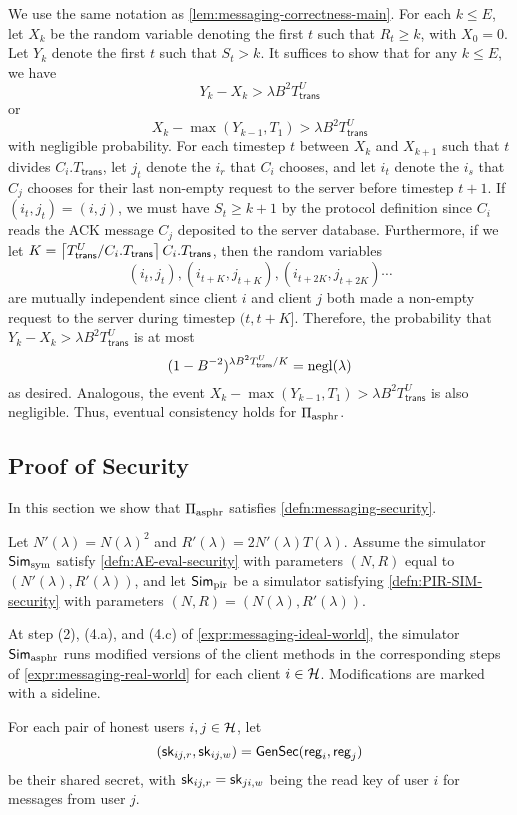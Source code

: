 We use the same notation as \cref{lem:messaging-correctness-main}. For each $k \leq E$, let $X_k$ be the random variable denoting the first $t$ such that $R_t \geq k$, with $X_0 = 0$. Let $Y_k$ denote the first $t$ such that $S_{t} > k$. It suffices to show that for any $k \leq E$, we have
 $$Y_k - X_k > \lambda B^2 T^U_{\mathsf{trans}}$$
 or
 $$X_{k} - \max(Y_{k - 1}, T_1) > \lambda B^2 T^U_{\mathsf{trans}}$$
 with negligible probability. For each timestep $t$ between $X_k$ and $X_{k + 1}$ such that $t$ divides $C_i.T_{\mathsf{trans}}$, let $j_t$ denote the $i_r$ that $C_i$ chooses, and let $i_t$ denote the $i_s$ that $C_j$ chooses for their last non-empty request to the server before timestep $t + 1$. If $(i_t, j_t) = (i, j)$, we must have $S_{t} \geq k + 1$ by the protocol definition since $C_i$ reads the ACK message $C_j$ deposited to the server database. Furthermore, if we let $K = \left\lceil T^U_{\mathsf{trans}} / C_i.T_{\mathsf{trans}} \right\rceil C_i.T_{\mathsf{trans}}$, then the random variables
 $$(i_t, j_t), (i_{t + K}, j_{t + K}), (i_{t + 2K}, j_{t + 2K})\cdots$$
are mutually independent since client $i$ and client $j$ both made a non-empty request to the server during timestep $(t, t + K]$. Therefore, the probability that $Y_k - X_k > \lambda B^2 T^U_{\mathsf{trans}}$ is at most
$$(1 - B^{-2})^{\lambda B^2 T^U_{\mathsf{trans}} / K} = \operatorname{negl}(\lambda)$$
as desired. Analogous, the event $X_{k} - \max(Y_{k - 1}, T_1) > \lambda B^2 T^U_{\mathsf{trans}}$ is also negligible. Thus, eventual consistency holds for $\Pi_{\text{asphr}}$.
\subsection{Proof of Security}
In this section we show that $\Pi_{\text{asphr}}$ satisfies \cref{defn:messaging-security}. 

Let $N'(\lambda) = N(\lambda)^2$ and $R'(\lambda) = 2N'(\lambda)T(\lambda)$. Assume the simulator $\mathsf{Sim}_{\text{sym}}$ satisfy \cref{defn:AE-eval-security} with parameters $(N, R)$ equal to $(N'(\lambda), R'(\lambda))$, and let $\mathsf{Sim}_{\text{pir}}$ be a simulator satisfying \cref{defn:PIR-SIM-security} with parameters $(N, R) = (N(\lambda), R'(\lambda))$. 

At step (2), (4.a), and (4.c) of \cref{expr:messaging-ideal-world}, the simulator $\mathsf{Sim}_{\text{asphr}}$ runs modified versions of the client methods in the corresponding steps of \cref{expr:messaging-real-world} for each client $i \in \mathcal{H}$. Modifications are marked with a sideline. 

For each pair of honest users $i, j \in \mathcal{H}$, let 
$$({\mathsf{sk}}_{ij, r}, {\mathsf{sk}}_{ij, w}) = \mathsf{GenSec}(\mathsf{reg}_i, \mathsf{reg}_j)$$ 
be their shared secret, with ${\mathsf{sk}}_{ij, r} = {\mathsf{sk}}_{ji, w}$ being the read key of user $i$ for messages from user $j$.

